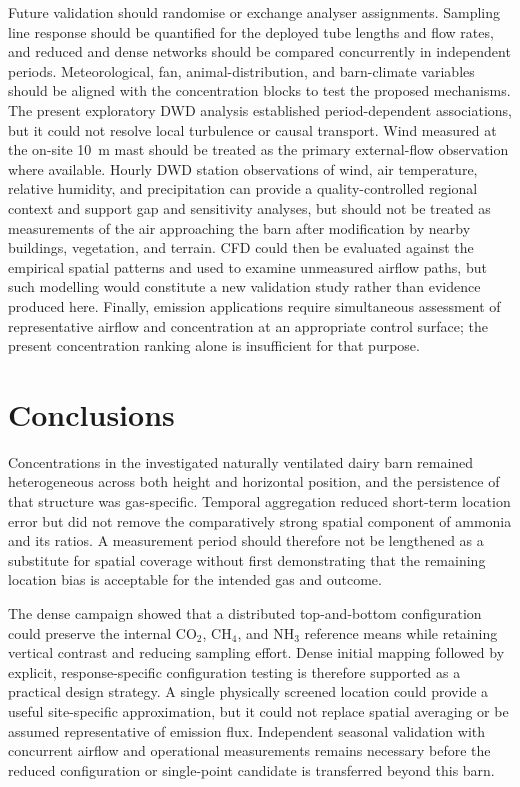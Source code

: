 \documentclass[12pt,a4paper]{article}
\begin{document}
Future validation should randomise or exchange analyser assignments. Sampling
line response should be quantified for the deployed tube lengths and flow
rates, and reduced and dense networks should be compared concurrently in
independent periods.
Meteorological, fan, animal-distribution, and barn-climate variables should be
aligned with the concentration blocks to test the proposed mechanisms. The
present exploratory DWD analysis established period-dependent associations,
but it could not resolve local turbulence or causal transport. Wind measured
at the on-site \SI{10}{m} mast should be treated as the primary external-flow
observation where available. Hourly DWD station observations of
wind, air temperature, relative humidity, and precipitation can provide a
quality-controlled regional context and support gap and sensitivity analyses,
but should not be treated as measurements of the air approaching the barn
after modification by nearby buildings, vegetation, and terrain.
CFD could then be evaluated against the empirical spatial patterns and used to
examine unmeasured airflow paths, but such modelling would constitute a new
validation study rather than evidence produced here. Finally, emission
applications require simultaneous assessment of representative airflow and
concentration at an appropriate control surface; the present concentration
ranking alone is insufficient for that purpose.

\section{Conclusions}

Concentrations in the investigated naturally ventilated dairy barn remained
heterogeneous across both height and horizontal position, and the persistence
of that structure was gas-specific. Temporal aggregation reduced short-term
location error but did not remove the comparatively strong spatial component
of ammonia and its ratios. A measurement period should therefore not be
lengthened as a substitute for spatial coverage without first demonstrating
that the remaining location bias is acceptable for the intended gas and
outcome.

The dense campaign showed that a distributed top-and-bottom configuration
could preserve the internal \(\mathrm{CO_2}\), \(\mathrm{CH_4}\), and
\(\mathrm{NH_3}\) reference means while retaining vertical contrast and
reducing sampling effort. Dense initial mapping followed by explicit,
response-specific configuration testing is therefore supported as a practical
design strategy. A single physically screened location could provide a useful
site-specific approximation, but it could not replace spatial averaging or be
assumed representative of emission flux. Independent seasonal validation with
concurrent airflow and operational measurements remains necessary before the
reduced configuration or single-point candidate is transferred beyond this
barn.
\end{document}
